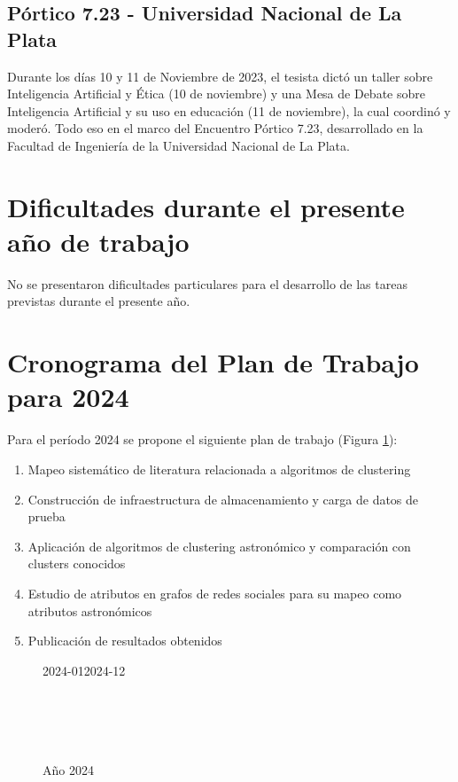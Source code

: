 \documentclass[
	11pt,oneside,a4paper,
	fleqn,
	article
]{memoir}
\begin{document}
\subsection{Pórtico 7.23 - Universidad Nacional de La Plata}

Durante los días 10 y 11 de Noviembre de 2023, el tesista dictó un taller sobre Inteligencia Artificial y Ética (10 de noviembre) y una Mesa de Debate sobre Inteligencia Artificial y su uso en educación (11 de noviembre), la cual coordinó y moderó. Todo eso en el marco del Encuentro Pórtico 7.23, desarrollado en la Facultad de Ingeniería de la Universidad Nacional de La Plata.


\section {Dificultades durante el presente año de trabajo}

No se presentaron dificultades particulares para el desarrollo de las tareas previstas durante el presente año.

\section {Cronograma del Plan de Trabajo para 2024}

Para el período 2024 se propone el siguiente plan de trabajo (Figura \ref{gantt:plan2024}):

\begin{enumerate}
	\item Mapeo sistemático de literatura relacionada a algoritmos de clustering
	\item Construcción de infraestructura de almacenamiento y carga de datos de prueba
	\item Aplicación de algoritmos de clustering astronómico y comparación con clusters conocidos
	\item Estudio de atributos en grafos de redes sociales para su mapeo como atributos astronómicos
	\item Publicación de resultados obtenidos
\end{enumerate}

\begin{figure}[H]
	\centering
	\begin{ganttchart}[
			title label font=\tiny,
			bar label font=\tiny,
			y unit chart=0.7cm,
			hgrid,
			vgrid,
			x unit=0.8cm,
			bar/.append style={draw=Black, fill=RoyalBlue!75},
			time slot format=isodate-yearmonth,
			time slot unit=month,
			newline shortcut=true,
			bar label node/.append style={align=right}
		]{2024-01}{2024-12}
		 \\
		 \\
		\\
		\\
		\\
	\end{ganttchart}
	\caption{Año 2024}
	\label{gantt:plan2024}
\end{figure}
\end{document}
